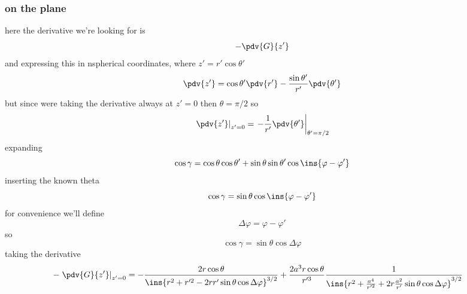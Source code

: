 \subsubsection{on the plane}
here the derivative we're looking for is 
\begin{equation}
	-\pdv{G}{z'}
\end{equation}
and expressing this in nspherical coordinates, where \(z' = r'\cos\theta'\)
\begin{equation}
	\pdv{z'} = \cos\theta'\pdv{r'}-\frac{\sin\theta'}{r'}\pdv{\theta'}
\end{equation}
but since were taking the derivative always at \(z'=0\) then \(\theta=\pi/2\) so
\begin{equation}
	\left.\pdv{z'}\right|_{z'=0} = \left.-\frac{1}{r'}\pdv{\theta'}\right|_{\theta'=\pi/2}
\end{equation}
expanding 
\begin{equation}
	\cos\gamma = \cos\theta\cos\theta'+\sin\theta\sin\theta'\cos\ins{\varphi-\varphi'}
\end{equation}
inserting the known theta 
\begin{equation}
	\cos\gamma = \sin\theta\cos\ins{\varphi-\varphi'}
\end{equation}
for convenience we'll define 
\begin{equation}
	\Delta\varphi = \varphi-\varphi'
\end{equation}
so 
\begin{equation}
	\cos\gamma = \sin\theta\cos\Delta\varphi
\end{equation}
taking the derivative 
\begin{align}
	-\left.\pdv{G}{z'}\right|_{z'=0} &= -\frac{2r\cos\theta}{\ins{r^2+r'^2-2rr'\sin\theta\cos\Delta\varphi}^{3/2}}+\frac{2a^3r\cos\theta}{r'^3}\frac{1}{\ins{r^2+\frac{a^4}{r'^2}+2r\frac{a^2}{r'}\sin\theta\cos\Delta\varphi}^{3/2}}
\end{align}
